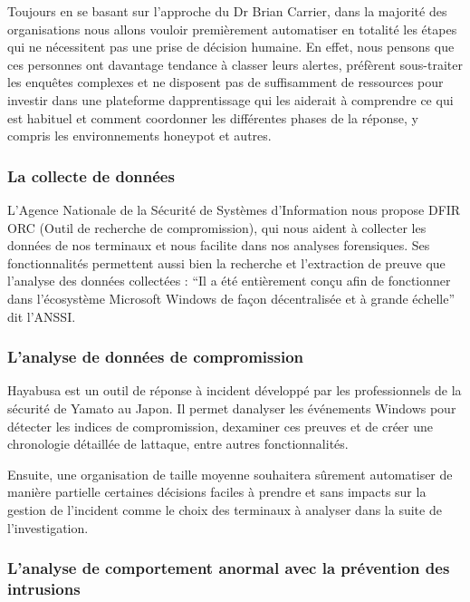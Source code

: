 \documentclass[
  11pt,
  a4paper,
  krantz2,
  11pt,
  oneside]{krantz}
\begin{document}
Toujours en se basant sur l'approche du Dr Brian Carrier, dans la majorité des organisations nous allons vouloir premièrement automatiser en totalité les étapes qui ne nécessitent pas une prise de décision humaine. En effet, nous pensons que ces personnes ont davantage tendance à classer leurs alertes, préfèrent sous-traiter les enquêtes complexes et ne disposent pas de suffisamment de ressources pour investir dans une plateforme d\textquotesingle apprentissage qui les aiderait à comprendre ce qui est habituel et comment coordonner les différentes phases de la réponse, y compris les environnements honeypot et autres.

\subsubsection{La collecte de données}\label{la-collecte-de-donnuxe9es}

L'Agence Nationale de la Sécurité de Systèmes d'Information nous propose DFIR ORC (Outil de recherche de compromission), qui nous aident à collecter les données de nos terminaux et nous facilite dans nos analyses forensiques. Ses fonctionnalités permettent aussi bien la recherche et l'extraction de preuve que l'analyse des données collectées : ``Il a été entièrement conçu afin de fonctionner dans l'écosystème Microsoft Windows de façon décentralisée et à grande échelle'' dit l'ANSSI.

\subsubsection{L'analyse de données de compromission}\label{lanalyse-de-donnuxe9es-de-compromission}

Hayabusa est un outil de réponse à incident développé par les professionnels de la sécurité de Yamato au Japon. Il permet d\textquotesingle analyser les événements Windows pour détecter les indices de compromission, d\textquotesingle examiner ces preuves et de créer une chronologie détaillée de l\textquotesingle attaque, entre autres fonctionnalités.

Ensuite, une organisation de taille moyenne souhaitera sûrement automatiser de manière partielle certaines décisions faciles à prendre et sans impacts sur la gestion de l'incident comme le choix des terminaux à analyser dans la suite de l'investigation.

\subsubsection{L'analyse de comportement anormal avec la prévention des intrusions}\label{lanalyse-de-comportement-anormal-avec-la-pruxe9vention-des-intrusions}
\end{document}
